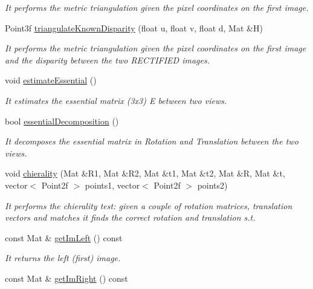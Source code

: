 \begin{DoxyCompactItemize}
\begin{DoxyCompactList}\small\item\em It performs the metric triangulation given the pixel coordinates on the first image. \end{DoxyCompactList}\item 
Point3f \hyperlink{classStereoCamera_a761ea623c4cde38b4fa1d798ef09b7ae}{triangulate\+Known\+Disparity} (float u, float v, float d, Mat \&H)
\begin{DoxyCompactList}\small\item\em It performs the metric triangulation given the pixel coordinates on the first image and the disparity between the two R\+E\+C\+T\+I\+F\+I\+ED images. \end{DoxyCompactList}\item 
void \hyperlink{classStereoCamera_ab2eded08bca185ac22cd6343cb4c85c8}{estimate\+Essential} ()
\begin{DoxyCompactList}\small\item\em It estimates the essential matrix (3x3) E between two views. \end{DoxyCompactList}\item 
bool \hyperlink{classStereoCamera_a180388e93b654802c7c56c18d206214b}{essential\+Decomposition} ()
\begin{DoxyCompactList}\small\item\em It decomposes the essential matrix in Rotation and Translation between the two views. \end{DoxyCompactList}\item 
void \hyperlink{classStereoCamera_aefb25fc2ecd8d0ce484e5981769dd635}{chierality} (Mat \&R1, Mat \&R2, Mat \&t1, Mat \&t2, Mat \&R, Mat \&t, vector$<$ Point2f $>$ points1, vector$<$ Point2f $>$ points2)
\begin{DoxyCompactList}\small\item\em It performs the chierality test\+: given a couple of rotation matrices, translation vectors and matches it finds the correct rotation and translation s.\+t. \end{DoxyCompactList}\item 
const Mat \& \hyperlink{classStereoCamera_ac0cb76a6994bd7ab915cb02d83cf8f8e}{get\+Im\+Left} () const
\begin{DoxyCompactList}\small\item\em It returns the left (first) image. \end{DoxyCompactList}\item 
const Mat \& \hyperlink{classStereoCamera_ac7930aa4fa0681246e74c08cf4b1079b}{get\+Im\+Right} () const

\end{DoxyCompactItemize}
